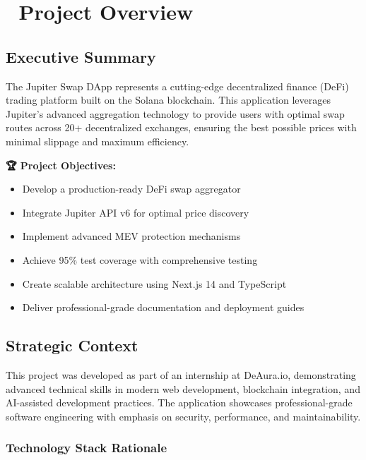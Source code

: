 \documentclass[12pt,a4paper]{article}
\begin{document}
\newpage
\tableofcontents
\newpage

\section{🎯 Project Overview}

\subsection{Executive Summary}

The Jupiter Swap DApp represents a cutting-edge decentralized finance (DeFi) trading platform built on the Solana blockchain. This application leverages Jupiter's advanced aggregation technology to provide users with optimal swap routes across 20+ decentralized exchanges, ensuring the best possible prices with minimal slippage and maximum efficiency.

\begin{tcolorbox}[colback=jupiterBlue!10,colframe=jupiterBlue]
\textbf{🏆 Project Objectives:}
\begin{itemize}
    \item Develop a production-ready DeFi swap aggregator
    \item Integrate Jupiter API v6 for optimal price discovery
    \item Implement advanced MEV protection mechanisms
    \item Achieve 95\% test coverage with comprehensive testing
    \item Create scalable architecture using Next.js 14 and TypeScript
    \item Deliver professional-grade documentation and deployment guides
\end{itemize}
\end{tcolorbox}

\subsection{Strategic Context}

This project was developed as part of an internship at DeAura.io, demonstrating advanced technical skills in modern web development, blockchain integration, and AI-assisted development practices. The application showcases professional-grade software engineering with emphasis on security, performance, and maintainability.

\subsubsection{Technology Stack Rationale}
\end{document}
